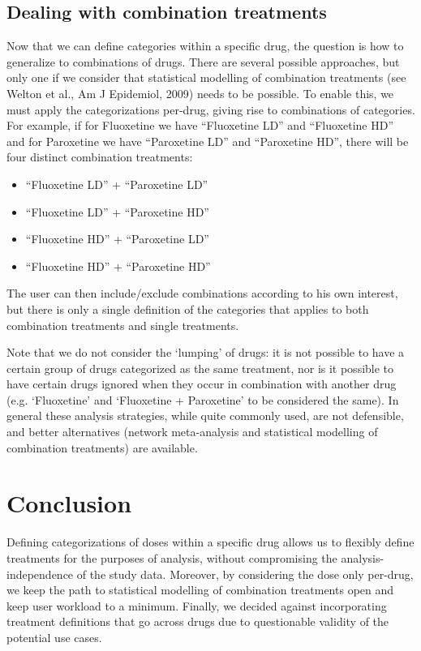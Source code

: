 \documentclass[a4paper]{article}
\begin{document}
\subsection{Dealing with combination treatments}

Now that we can define categories within a specific drug, the question is how to generalize to combinations of drugs.
There are several possible approaches, but only one if we consider that statistical modelling of combination treatments (see Welton et al., Am J Epidemiol, 2009) needs to be possible.
To enable this, we must apply the categorizations per-drug, giving rise to combinations of categories.
For example, if for Fluoxetine we have ``Fluoxetine LD'' and ``Fluoxetine HD'' and for Paroxetine we have ``Paroxetine LD'' and ``Paroxetine HD'', there will be four distinct combination treatments:
\begin{itemize}
\item ``Fluoxetine LD'' + ``Paroxetine LD''
\item ``Fluoxetine LD'' + ``Paroxetine HD''
\item ``Fluoxetine HD'' + ``Paroxetine LD''
\item ``Fluoxetine HD'' + ``Paroxetine HD''
\end{itemize}
The user can then include/exclude combinations according to his own interest, but there is only a single definition of the categories that applies to both combination treatments and single treatments.

Note that we do not consider the `lumping' of drugs: it is not possible to have a certain group of drugs categorized as the same treatment, nor is it possible to have certain drugs ignored when they occur in combination with another drug (e.g. `Fluoxetine' and `Fluoxetine + Paroxetine' to be considered the same).
In general these analysis strategies, while quite commonly used, are not defensible, and better alternatives (network meta-analysis and statistical modelling of combination treatments) are available.

\section{Conclusion}

Defining categorizations of doses within a specific drug allows us to flexibly define treatments for the purposes of analysis, without compromising the analysis-independence of the study data.
Moreover, by considering the dose only per-drug, we keep the path to statistical modelling of combination treatments open and keep user workload to a minimum.
Finally, we decided against incorporating treatment definitions that go across drugs due to questionable validity of the potential use cases.
\end{document}
